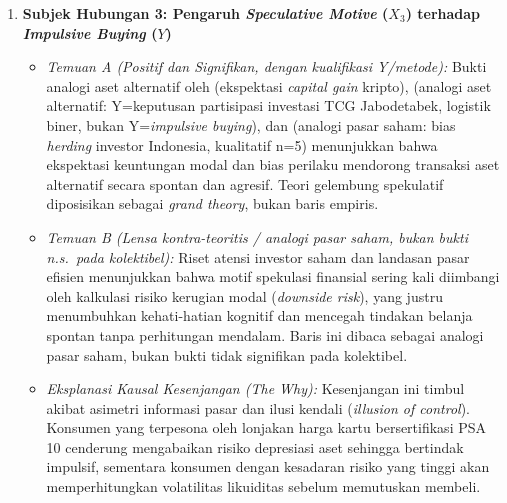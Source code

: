 \documentclass[12pt,a4paper]{article}
\numberwithin{equation}{section}
\numberwithin{table}{section}
\numberwithin{figure}{section}
\begin{document}
\begin{enumerate}
  \item \textbf{Subjek Hubungan 3: Pengaruh \emph{Speculative Motive} ($X_3$) terhadap \emph{Impulsive Buying} ($Y$)}
  \begin{itemize}
    \item \emph{Temuan A (Positif dan Signifikan, dengan kualifikasi Y/metode):} Bukti analogi aset alternatif oleh \citet{baur2018bitcoin} (ekspektasi \emph{capital gain} kripto), \citet{aryadi2024personal} (analogi aset alternatif: Y=keputusan partisipasi investasi TCG Jabodetabek, logistik biner, bukan Y=\emph{impulsive buying}), dan \citet{colline2024biases} (analogi pasar saham: bias \emph{herding} investor Indonesia, kualitatif n=5) menunjukkan bahwa ekspektasi keuntungan modal dan bias perilaku mendorong transaksi aset alternatif secara spontan dan agresif. Teori gelembung spekulatif \citet{shiller2000irrational} diposisikan sebagai \emph{grand theory}, bukan baris empiris.
    \item \emph{Temuan B (Lensa kontra-teoritis / analogi pasar saham, bukan bukti n.s.\ pada kolektibel):} Riset atensi investor saham \citet{barber2008all} dan landasan pasar efisien \citet{fama1970efficient} menunjukkan bahwa motif spekulasi finansial sering kali diimbangi oleh kalkulasi risiko kerugian modal (\emph{downside risk}), yang justru menumbuhkan kehati-hatian kognitif dan mencegah tindakan belanja spontan tanpa perhitungan mendalam. Baris ini dibaca sebagai analogi pasar saham, bukan bukti tidak signifikan pada kolektibel.
    \item \emph{Eksplanasi Kausal Kesenjangan (\emph{The Why}):} Kesenjangan ini timbul akibat asimetri informasi pasar dan ilusi kendali (\emph{illusion of control}). Konsumen yang terpesona oleh lonjakan harga kartu bersertifikasi PSA 10 cenderung mengabaikan risiko depresiasi aset sehingga bertindak impulsif, sementara konsumen dengan kesadaran risiko yang tinggi akan memperhitungkan volatilitas likuiditas sebelum memutuskan membeli.
  \end{itemize}


\end{enumerate}
\end{document}
